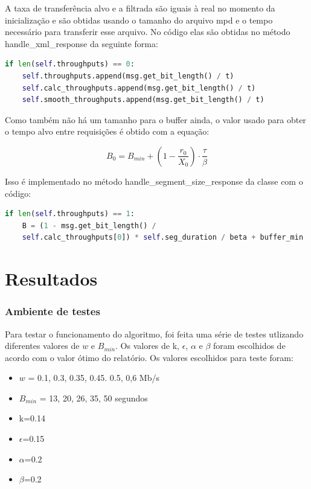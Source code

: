 \documentclass[10pt,twocolumn,letterpaper]{article}
\begin{document}
A taxa de transferência alvo e a filtrada são iguais à real no momento da inicialização e são obtidas usando o tamanho do arquivo mpd e o tempo necessário para transferir esse arquivo. No código elas são obtidas no método handle\_xml\_response da seguinte forma:

\begin{lstlisting}[language=python]
	if len(self.throughputs) == 0:
	self.throughputs.append(msg.get_bit_length() / t)
	self.calc_throughputs.append(msg.get_bit_length() / t)
	self.smooth_throughputs.append(msg.get_bit_length() / t)
\end{lstlisting}

Como também não há um tamanho para o buffer ainda, o valor usado para obter o tempo alvo entre requisições é obtido com a equação:

\begin{equation}
	B_0 = B_{min} + (1 - \frac{r_0}{X_0}) \cdot \frac{\tau}{\beta}
\end{equation}

Isso é implementado no método handle\_segment\_size\_response da classe com o código:

\begin{lstlisting}[language=python]
	if len(self.throughputs) == 1:
	B = (1 - msg.get_bit_length() /
	self.calc_throughputs[0]) * self.seg_duration / beta + buffer_min
	\end{lstlisting}
	\section{Resultados}
	\subsubsection{Ambiente de testes}
	Para testar o funcionamento do algoritmo, foi feita uma série de testes utlizando diferentes valores de $w$ e $B_{min}$. Os valores de k, $\epsilon$, $\alpha$ e $\beta$ foram escolhidos de acordo com o valor ótimo do relatório. Os valores escolhidos para teste foram: 
	\begin{itemize}
		\item $w$ = 0.1, 0.3, 0.35, 0.45. 0.5, 0,6 Mb/s
		\item $B_{min}$  = 13, 20, 26, 35, 50 segundos
		\item k=0.14 
		\item $\epsilon$=0.15 
		\item $\alpha$=0.2
		\item $\beta$=0.2
	\end{itemize}
\end{document}
